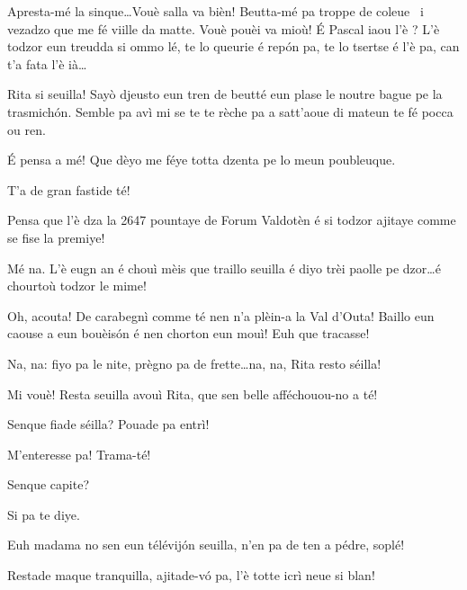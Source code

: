 \begin{drama}
\Ritaspeaks {} Apresta-mé la sinque\ldots Vouè salla va bièn!  Beutta-mé pa troppe de coleue \trucco\ i vezadzo que me fé viille da matte. Vouè pouèi va mioù! É Pascal iaou l’è ? L’è todzor eun treudda si ommo lé, te lo queurie é repón pa, te lo tsertse é l’è pa, can t’a fata l’è ià\ldots

\Pascalspeaks Rita si seuilla! Sayò djeusto eun tren de beutté eun plase le noutre bague pe la trasmichón. Semble pa avì mi se te te rèche pa a satt'aoue di mateun te fé pocca ou ren.

\Ritaspeaks É pensa a mé! Que dèyo me féye totta dzenta pe lo meun poubleuque.

\Pascalspeaks T’a de gran fastide té!

\Ritaspeaks Pensa que l’è dza la 2647 pountaye de Forum Valdotèn é si todzor ajitaye comme se fise la premiye!

\Pascalspeaks Mé na. L’è eugn an é chouì mèis que traillo seuilla é diyo trèi paolle pe dzor\ldots é chourtoù todzor le mime!

\Ritaspeaks Oh, acouta! De carabegnì comme té nen n'a plèin-a la Val d’Outa! Baillo eun caouse a eun bouèis\'on é nen chorton eun mouì! Euh que tracasse!

\Pascalspeaks Na, na: fiyo pa le nite, prègno pa de frette\ldots na, na, Rita resto séilla!

\Ritaspeaks Mi vouè!  Resta seuilla avouì Rita, que sen belle af\-fé\-chou\-ou-no a té!


\Pascalspeaks Senque fiade séilla? Pouade pa entrì!

\Eumprezeospeaks M’enteresse pa! Trama-té!

\Ritaspeaks Senque capite? 


\Pascalspeaks Si pa te diye.

\Ritaspeaks {} Euh madama no sen eun télévijón seuilla, n'en pa de ten a pédre, soplé!

\Eumprezeospeaks Restade maque tranquilla, ajitade-v\'o pa, l’è tot\-te icrì neue si blan!


\end{drama}
